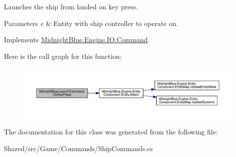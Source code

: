 Launches the ship from landed on key press. 


\begin{DoxyParams}{Parameters}
{\em e} & Entity with ship controller to operate on.\\
\hline
\end{DoxyParams}


Implements \hyperlink{class_midnight_blue_1_1_engine_1_1_i_o_1_1_command_ae641d2c1a9db17f03ee6b7854b00a9d2}{Midnight\+Blue.\+Engine.\+I\+O.\+Command}.

Here is the call graph for this function\+:
\nopagebreak
\begin{figure}[H]
\begin{center}
\leavevmode
\includegraphics[width=350pt]{class_midnight_blue_1_1_launch_command_a5da2fdd898111ea59f4f63126c380a3e_cgraph}
\end{center}
\end{figure}


The documentation for this class was generated from the following file\+:\begin{DoxyCompactItemize}
\item 
Shared/src/\+Game/\+Commands/Ship\+Commands.\+cs\end{DoxyCompactItemize}
